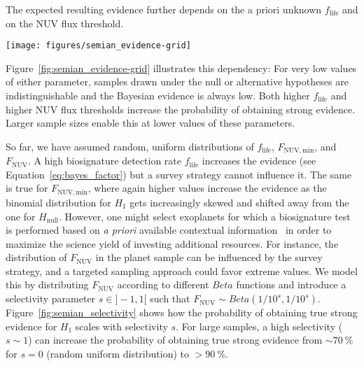 \documentclass[twocolumn,twocolappendix,linenumbers]{aastex631}
\begin{document}
The expected resulting evidence further depends on the a priori unknown  $f_\mathrm{life}$ and on the \gls{NUV} flux threshold.
\begin{figure*}
    \begin{centering}
        \texttt{[image: figures/semian\_evidence-grid]}
        \caption{Probability of obtaining true strong evidence for different abiogenesis rates, \gls{NUV} flux thresholds, and sample sizes. For each of these parameters, higher values increase the probability of yielding strong evidence.}
        \label{fig:semian_evidence-grid}
    \end{centering}
\end{figure*}
Figure~\ref{fig:semian_evidence-grid} illustrates this dependency: For very low values of either parameter, samples drawn under the null or alternative hypotheses are indistinguishable and the Bayesian evidence is always low.
Both higher $f_\mathrm{life}$ and higher \gls{NUV} flux thresholds increase the probability of obtaining strong evidence.
Larger sample sizes enable this at lower values of these parameters.


So far, we have assumed random, uniform distributions of $f_\mathrm{life}$, $F_\mathrm{NUV, min}$, and $F_\mathrm{NUV}$. %
A high biosignature detection rate $f_\mathrm{life}$ increases the evidence (see Equation~\ref{eq:bayes_factor}) but a survey strategy cannot influence it.
The same is true for $F_\mathrm{NUV, min}$, where again higher values increase the evidence as the binomial distribution for $H_\mathrm{1}$ gets increasingly skewed and shifted away from the one for $H_\mathrm{null}$.
However, one might select exoplanets for which a biosignature test is performed based on \textit{a priori} available contextual information~\citep{catling2018exoplanet} in order to maximize the science yield of investing additional resources.
For instance, the distribution of $F_\mathrm{NUV}$ in the planet sample can be influenced by the survey strategy, and a targeted sampling approach could favor extreme values. %
We model this by distributing $F_\mathrm{NUV}$ according to different $Beta$ functions and introduce a selectivity parameter $s\in]-1,1[$ such that $F_\mathrm{NUV} \sim Beta(1/10^s,1/10^s)$.
Figure~\ref{fig:semian_selectivity} shows how the probability of obtaining true strong evidence for $H_\mathrm{1}$ scales with selectivity $s$.
For large samples, a high selectivity ($s \sim 1$) can increase the probability of obtaining true strong evidence from $\sim \SI{70}{\percent}$ for $s= 0$ (random uniform distribution) to $> \SI{90}{\percent}$.
\end{document}
